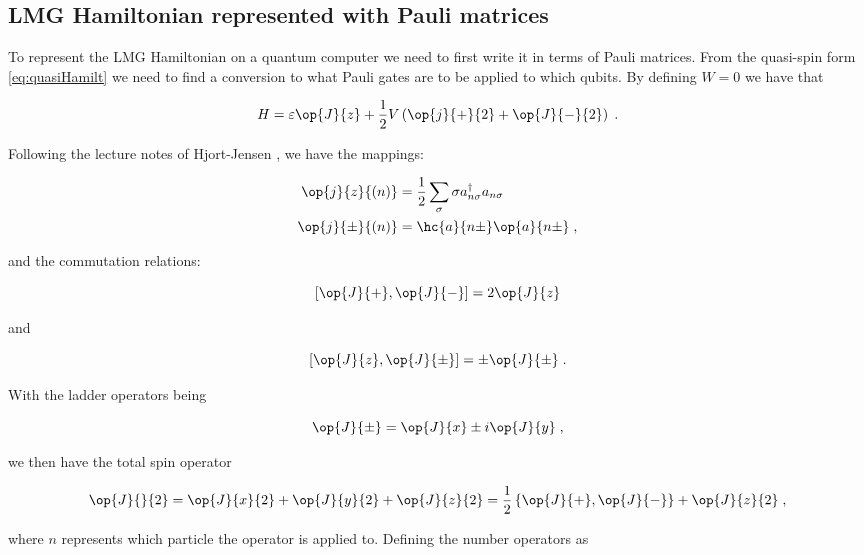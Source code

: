 \subsection{LMG Hamiltonian represented with Pauli matrices}

To represent the LMG Hamiltonian on a quantum computer we need to first write it in terms of Pauli matrices. From the quasi-spin form \ref{eq:quasiHamilt} we need to find a conversion to what Pauli gates are to be applied to which qubits. By defining $W = 0$ we have that

\begin{equation}
H = \varepsilon \op{J}{z} + \frac{1}{2}V \left ( \op{j}{+}{2}+\op{J}{-}{2} \right ) \; .
\end{equation}


Following the lecture notes of Hjort-Jensen \cite{LipkinQuasiToPauli}, we have the mappings:

\begin{align} \label{eq:mappingJ}
    \op{j}{z}{(n)} &=\frac{1}{2}\sum_{\sigma}\sigma a^\dagger_{n\sigma}a_{n\sigma} \\
    \op{j}{\pm}{(n)}&= \hc{a}{n\pm}\op{a}{n\pm} \; ,
\end{align}

and the commutation relations:

\begin{equation}
    \left [ \op{J}{+}, \op{J}{-} \right ] = 2\op{J}{z}
\end{equation}

and 


\begin{equation}
    \left [ \op{J}{z}, \op{J}{\pm} \right ] = \pm \op{J}{\pm} \; .
\end{equation}

With the ladder operators being

\begin{equation} \label{eq:ladderJ}
    \op{J}{\pm} = \op{J}{x} \pm i\op{J}{y} \; ,
\end{equation}

we then have the total spin operator

\begin{equation}
    \op{J}{}{2} = \op{J}{x}{2} + \op{J}{y}{2} + \op{J}{z}{2} = \frac{1}{2} \left \{ \op{J}{+}, \op{J}{-} \right \} + \op{J}{z}{2} \; ,
\end{equation}

where $n$ represents which particle the operator is applied to. Defining the number operators as

